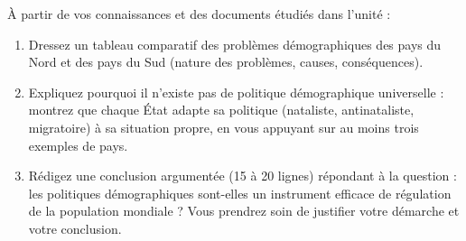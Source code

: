 \documentclass[11pt]{article}
\begin{document}
\begin{exercice}
À partir de vos connaissances et des documents étudiés dans l'unité :

\begin{enumerate}
\item Dressez un tableau comparatif des problèmes démographiques des pays du Nord et des pays du Sud (nature des problèmes, causes, conséquences).
\item Expliquez pourquoi il n'existe pas de politique démographique universelle : montrez que chaque État adapte sa politique (nataliste, antinataliste, migratoire) à sa situation propre, en vous appuyant sur au moins trois exemples de pays.
\item Rédigez une conclusion argumentée (15 à 20 lignes) répondant à la question : les politiques démographiques sont-elles un instrument efficace de régulation de la population mondiale ? Vous prendrez soin de justifier votre démarche et votre conclusion.
\end{enumerate}
\end{exercice}
\end{document}
